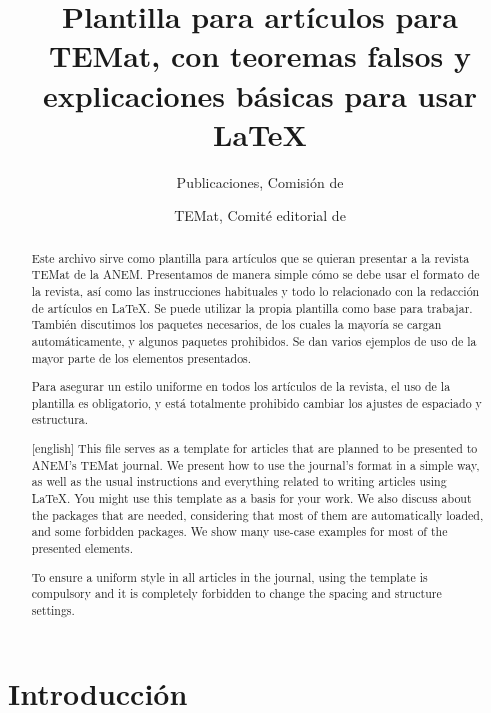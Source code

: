 \documentclass[bibtex]{TEMat-article}
\title[Plantilla para artículos para TEMat]{Plantilla para artículos para TEMat, con teoremas falsos y explicaciones básicas para usar \LaTeX{}}
\author{Publicaciones, Comisión de}
\affiliation{Asociación Nacional de Estudiantes de Matemáticas (ANEM)}
\author*{TEMat, Comité editorial de}
\affiliation{Asociación Nacional de Estudiantes de Matemáticas (ANEM)}
\begin{document}
\begin{abstract}
Este archivo sirve como plantilla para artículos que se quieran presentar a la revista TEMat de la ANEM.
Presentamos de manera simple cómo se debe usar el formato de la revista, así como las instrucciones habituales y todo lo relacionado con la redacción de artículos en \LaTeX.
Se puede utilizar la propia plantilla como base para trabajar.
También discutimos los paquetes necesarios, de los cuales la mayoría se cargan automáticamente, y algunos paquetes prohibidos.
Se dan varios ejemplos de uso de la mayor parte de los elementos presentados.

Para asegurar un estilo uniforme en todos los artículos de la revista, el uso de la plantilla es obligatorio, y está totalmente prohibido cambiar los ajustes de espaciado y estructura.
\end{abstract}
\begin{abstract}[english]
This file serves as a template for articles that are planned to be presented to ANEM's TEMat journal.
We present how to use the journal's format in a simple way, as well as the usual instructions and everything related to writing articles using \LaTeX.
You might use this template as a basis for your work.
We also discuss about the packages that are needed, considering that most of them are automatically loaded, and some forbidden packages.
We show many use-case examples for most of the presented elements.

To ensure a uniform style in all articles in the journal, using the template is compulsory and it is completely forbidden to change the spacing and structure settings.
\end{abstract}
\maketitle

\section{Introducción}
\end{document}
